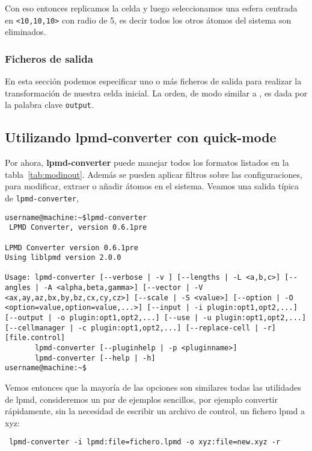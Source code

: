
Con eso entonces replicamos la celda y luego seleccionamos una esfera centrada en \verb|<10,10,10>| con radio de 5, es decir todos los otros \'atomos del sistema son eliminados.

\subsubsection{Ficheros de salida}
En esta secci\'on podemos especificar uno o m\'as ficheros de salida para realizar la transformaci\'on de nuestra celda inicial. La orden, de modo similar a {\lpmd}, es dada por la palabra clave \verb|output|.


\subsection{Utilizando lpmd-converter con quick-mode}
Por ahora, \textbf{lpmd-converter} puede manejar todos los formatos listados en la tabla~\ref{tab:modinout}. Adem\'as se pueden aplicar filtros sobre las configuraciones, para modificar, extraer o a\~nadir \'atomos en el sistema. Veamos una salida t\'ipica de \verb|lpmd-converter|,

\begin{verbatim}
username@machine:~$lpmd-converter
 LPMD Converter, version 0.6.1pre

LPMD Converter version 0.6.1pre
Using liblpmd version 2.0.0

Usage: lpmd-converter [--verbose | -v ] [--lengths | -L <a,b,c>] [--angles | -A <alpha,beta,gamma>] [--vector | -V <ax,ay,az,bx,by,bz,cx,cy,cz>] [--scale | -S <value>] [--option | -O <option=value,option=value,...>] [--input | -i plugin:opt1,opt2,...] [--output | -o plugin:opt1,opt2,...] [--use | -u plugin:opt1,opt2,...] [--cellmanager | -c plugin:opt1,opt2,...] [--replace-cell | -r] [file.control]
       lpmd-converter [--pluginhelp | -p <pluginname>]
       lpmd-converter [--help | -h]
username@machine:~$
\end{verbatim}

Vemos entonces que la mayor\'ia de las opciones son similares todas las utilidades de lpmd, consideremos un par de ejemplos sencillos, por ejemplo convertir r\'apidamente, sin la necesidad de escribir un archivo de control, un fichero lpmd a xyz:

\begin{verbatim}
 lpmd-converter -i lpmd:file=fichero.lpmd -o xyz:file=new.xyz -r
\end{verbatim}

